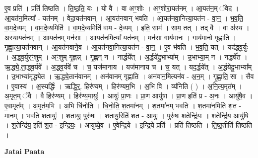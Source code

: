 \documentclass[17pt]{extarticle}
\begin{document}
ए॒व प्रति॑ । प्रति॑ तिष्ठति । ति॒ष्ठ॒ति॒ यः । यो वै । वा अꣳ॒॒शोः । अꣳ॒॒शोरा॒यत॑नम् । आ॒यत॑न॒म् ॅवेद॑ । आ॒यत॑न॒मित्या᳚ - यत॑नम् । वेदा॒यत॑नवान् । आ॒यत॑नवान् भवति । आ॒यत॑नवा॒नित्या॒यत॑न - वा॒न्॒ । भ॒व॒ति॒ वा॒म॒दे॒व्यम् । वा॒म॒दे॒व्यमिति॑ । वा॒म॒दे॒व्यमिति॑ वाम - दे॒व्यम् । इति॒ साम॑ । साम॒ तत् । तद् वै । वा अ॑स्य । अ॒स्या॒यत॑नम् । आ॒यत॑न॒म् मन॑सा । आ॒यत॑न॒मित्या᳚ यत॑नम् । मन॑सा॒ गाय॑मानः । गाय॑मानो गृह्णाति । गृ॒ह्णा॒त्या॒यत॑नवान् । आ॒यत॑नवाने॒व । आ॒यत॑नवा॒नित्या॒यत॑न - वा॒न्॒ । ए॒व भ॑वति । भ॒व॒ति॒ यत् । यद॑द्ध्व॒र्युः । अ॒द्ध्व॒र्युरꣳ॒॒शुम् । अꣳ॒॒शुम् गृ॒ह्णन्न् । गृ॒ह्णन् न । नार्द्धये᳚त् । अ॒र्द्धये॑दु॒भाभ्या᳚म् । उ॒भाभ्या॒म् न । नर्द्ध्ये᳚त । ऋ॒द्ध्ये॒,ता॒द्ध्व॒र्यवे᳚ । अ॒द्ध्व॒र्यवे॑ च । च॒ यज॑मानाय । यज॑मानाय च । च॒ यत् । यद॒र्द्धये᳚त् । अ॒र्द्धये॑दु॒भाभ्या᳚म् । उ॒भाभ्या॑मृद्ध्येत । ऋ॒द्ध्ये॒तान॑वानम् । अन॑वानम् गृह्णाति । अन॑वान॒मित्यन॑व - अ॒न॒म् । गृ॒ह्णा॒ति॒ सा । सैव । ए॒वास्य॑ । अ॒स्यर्द्धिः॑ । ऋद्धि॒र्॒. हिर॑ण्यम् । हिर॑ण्यम॒भि । अ॒भि वि । व्य॑निति ( ) । अ॒नि॒त्य॒मृत᳚म् । अ॒मृत॒म् ॅवै । वै हिर॑ण्यम् । हिर॑ण्य॒मायुः॑ । आयुः॑ प्रा॒णः । प्रा॒ण आयु॑षा । प्रा॒ण इति॑ प्र - अ॒नः । आयु॑षै॒व । ए॒वामृत᳚म् । अ॒मृत॑म॒भि । अ॒भि धि॑नोति । धि॒नो॒ति॒ श॒तमा॑नम् । श॒तमा॑नम् भवति । श॒तमा॑न॒मिति॑ श॒त - मा॒न॒म् । भ॒व॒ति॒ श॒तायुः॑ । श॒तायुः॒ पुरु॑षः । श॒तायु॒रिति॑ श॒त - आ॒युः॒ । पुरु॑षः श॒तेन्द्रि॑यः । श॒तेन्द्रि॑य॒ आयु॑षि । श॒तेन्द्रि॑य॒ इति॑ श॒त - इ॒न्द्रि॒यः॒ । आयु॑ष्ये॒व । ए॒वेन्द्रि॒ये । इ॒न्द्रि॒ये प्रति॑ । प्रति॑ तिष्ठति । ति॒ष्ठ॒तीति॑ तिष्ठति । \newline

\textbf{Jatai Paata} \newline
\end{document}
